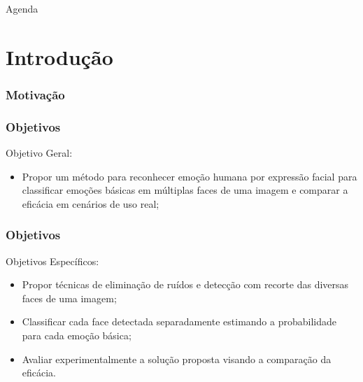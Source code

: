\documentclass{beamer}
\date{Manaus, 30 de Julho de 2018}
\begin{document}
\begin{frame}
 \maketitle
\end{frame}

\begin{frame}{Agenda}
  \tableofcontents
\end{frame}

\section{Introdu\c{c}\~ao}

\begin{frame}
\frametitle{Motivação}
\pause


\end{frame}


\begin{frame}
\frametitle{Objetivos}
\begin{block}{Objetivo Geral:}
\begin{itemize}
\pause
\item Propor um método para reconhecer emoção humana por expressão facial para classificar emoções básicas em múltiplas faces de uma imagem e comparar a eficácia em cenários de uso real;
\end{itemize}
\end{block}


\frametitle{Objetivos}
\begin{block}{Objetivos Específicos:}
\begin{itemize}
\pause
 \item Propor técnicas de eliminação de ruídos e detecção com recorte das diversas faces de uma imagem;
 \pause
 \item Classificar cada face detectada separadamente estimando a probabilidade para cada emoção básica;
 \pause
 \item Avaliar experimentalmente a solução proposta visando a comparação da eficácia.
\end{itemize}
\end{block}
\end{frame}
\end{document}

